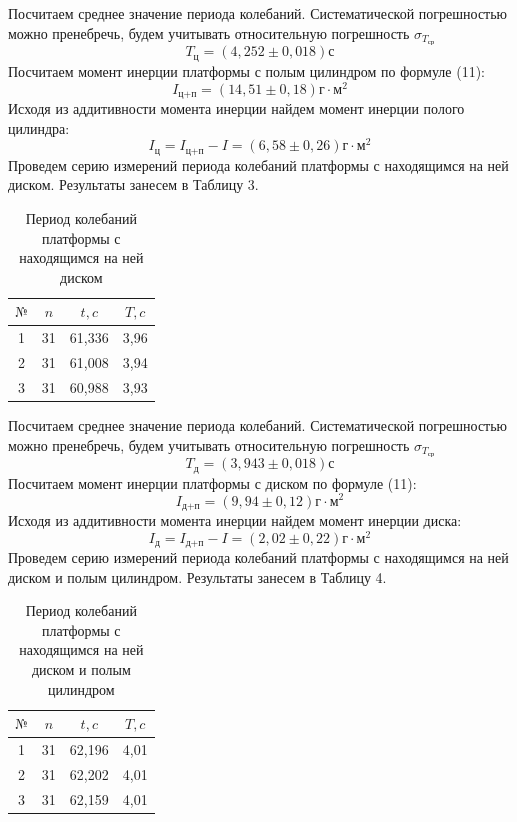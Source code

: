 \documentclass[a4paper,12pt]{article} %
\begin{document}
Посчитаем среднее значение периода колебаний. Систематической погрешностью можно пренебречь, будем учитывать относительную погрешность $\sigma_{T_\text{ср}}$
\[T_\text{ц} = (4,252\pm0,018)\text{с}\]
Посчитаем момент инерции платформы с полым цилиндром по формуле (11):
\[I_\text{ц+п} = (14,51\pm 0,18)\text{г}\cdot \text{м}^2\]
Исходя из аддитивности момента инерции найдем момент инерции полого цилиндра:
\[I_\text{ц} = I_\text{ц+п} - I = (6,58\pm 0,26)\text{г}\cdot \text{м}^2\]
Проведем серию измерений периода колебаний платформы с находящимся на ней диском. Результаты занесем в Таблицу 3.
\begin{table}[h]
\centering
\begin{tabular}{|c|c|c|c|}
\hline
$\text{№}$ & $n$  & $t, c$ & $T, c$   \\ \hline
1 & 31 & 61,336 & 3,96 \\ \hline
2 & 31 & 61,008 & 3,94 \\ \hline
3 & 31 & 60,988 & 3,93 \\ \hline
\end{tabular}
\caption{Период колебаний платформы с находящимся на ней диском}
\end{table}

Посчитаем среднее значение периода колебаний. Систематической погрешностью можно пренебречь, будем учитывать относительную погрешность $\sigma_{T_\text{ср}}$
\[T_\text{д} = (3,943\pm0,018)\text{с}\]
Посчитаем момент инерции платформы с диском по формуле (11):
\[I_\text{д+п} = (9,94\pm 0,12)\text{г}\cdot \text{м}^2\]
Исходя из аддитивности момента инерции найдем момент инерции диска:
\[I_\text{д} = I_\text{д+п} - I = (2,02\pm 0,22)\text{г}\cdot \text{м}^2\]
Проведем серию измерений периода колебаний платформы с находящимся на ней диском и полым цилиндром. Результаты занесем в Таблицу 4.

\begin{table}[!h]
\centering
\begin{tabular}{|c|c|c|c|}
\hline
$\text{№}$ & $n$  & $t, c$ & $T, c$   \\ \hline
1 & 31 & 62,196 & 4,01 \\ \hline
2 & 31 & 62,202 & 4,01 \\ \hline
3 & 31 & 62,159 & 4,01 \\ \hline
\end{tabular}
\caption{Период колебаний платформы с находящимся на ней диском и полым цилиндром}
\end{table}
\end{document}
